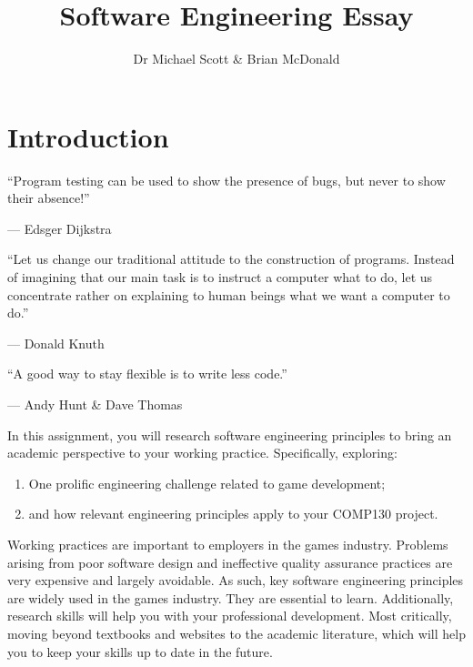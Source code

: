 \documentclass{../../../fal_assignment}
\title{Software Engineering Essay}
\author{Dr Michael Scott \& Brian McDonald}
\begin{document}
\maketitle

\section*{Introduction}

\begin{marginquote}
  ``Program testing can be used to show the presence of bugs, but never to show their absence!''
  
   --- Edsger Dijkstra
   
    \marginquoterule
    
    ``Let us change our traditional attitude to the construction of programs. Instead of imagining that our main task is to instruct a computer what to do, let us concentrate rather on explaining to human beings what we want a computer to do.''
    
    --- Donald Knuth
    
    \marginquoterule
    
    ``A good way to stay flexible is to write less code.''
    
    --- Andy Hunt \& Dave Thomas
      
\end{marginquote}

In this assignment, you will research software engineering principles to bring an academic perspective to your working practice. Specifically, exploring: 

\begin{enumerate}[label=(\roman*)]
    \item One prolific engineering challenge related to game development;
    \item and how relevant engineering principles apply to your COMP130 project.
\end{enumerate}

Working practices are important to employers in the games industry. Problems arising from poor software design and ineffective quality assurance practices are very expensive and largely avoidable. As such, key software engineering principles are widely used in the games industry. They are essential to learn. Additionally, research skills will help you with your professional development. Most critically, moving beyond textbooks and websites to the academic literature, which will help you to keep your skills up to date in the future.
\end{document}
